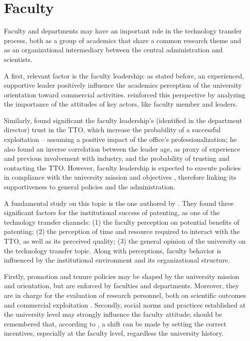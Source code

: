 \section{Faculty}

Faculty and departments may have an important role in the technology transfer process, both as a group of academics that share a common research theme and as an organizational intermediary between the central administration and scientists. 

A first, relevant factor is the faculty leadership: as stated before, an experienced, supportive leader positively influence the academics perception of the university orientation toward commercial activities. \citet{Guerrero2014} reinforced this perspective by analyzing the importance of the attitudes of key actors, like faculty member and leaders. 

Similarly, \citet{Muscio2010} found significant the faculty leadership's (identified in the department director) trust in the TTO, which increase the probability of a successful exploitation – assuming a positive impact of the office's professionalization; he also found an inverse correlation between the leader age, as proxy of experience and previous involvement with industry, and the probability of trusting and contacting the TTO. However, faculty leadership is expected to execute policies in compliance with the university mission and objectives \citep{Chang2016}, therefore linking its supportiveness to general policies and the administration. 

A fundamental study on this topic is the one authored by \citet{OwenSmith2001}. They found three significant factors for the institutional success of patenting, as one of the technology transfer channels: (1) the faculty perception on potential benefits of patenting; (2) the perception of time and resource required to interact with the TTO, as well as its perceived quality; (3) the general opinion of the university on the technology transfer topic. Along with perceptions, faculty behavior is influenced by the institutional environment and its organizational structure. 

Firstly, promotion and tenure policies may be shaped by the university mission and orientation, but are enforced by faculties and departments. Moreover, they are in charge for the evaluation of research personnel, both on scientific outcomes and commercial exploitation \citep{Chang2016}. Secondly, social norms and practices established at the university level may strongly influence the faculty attitude; should be remembered that, according to \citet{Bercovitz2006}, a shift can be made by setting the correct incentives, especially at the faculty level, regardless the university history.

